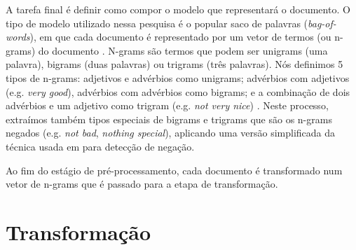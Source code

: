 A tarefa final é definir como compor o modelo que representará o documento. O tipo de modelo utilizado nessa pesquisa é o popular saco de palavras (\textit{bag-of-words}), em que cada documento é representado por um vetor de termos (ou n-grams) do documento \cite{moraes2012document}. N-grams são termos que podem ser unigrams (uma palavra), bigrams (duas palavras) ou trigrams (três palavras).  Nós definimos 5 tipos de n-grams: adjetivos e advérbios como unigrams; advérbios com adjetivos (e.g. \textit{very good}), advérbios com advérbios como bigrams; e a combinação de dois advérbios e um adjetivo como trigram (e.g. \textit{not very nice}) \cite{pang2002thumbs, turney2002thumbs, taboada2008extracting, karamibekr2012verb}. Neste processo, extraímos também tipos especiais de bigrams e trigrams  que são os n-grams negados (e.g. \textit{not bad}, \textit{nothing special}), aplicando uma versão simplificada da técnica usada em \cite{taboada2011lexicon} para detecção de negação.  

Ao fim do estágio de pré-processamento, cada documento é transformado num vetor de n-grams que é passado para a etapa de transformação.  

\section{Transformação}


